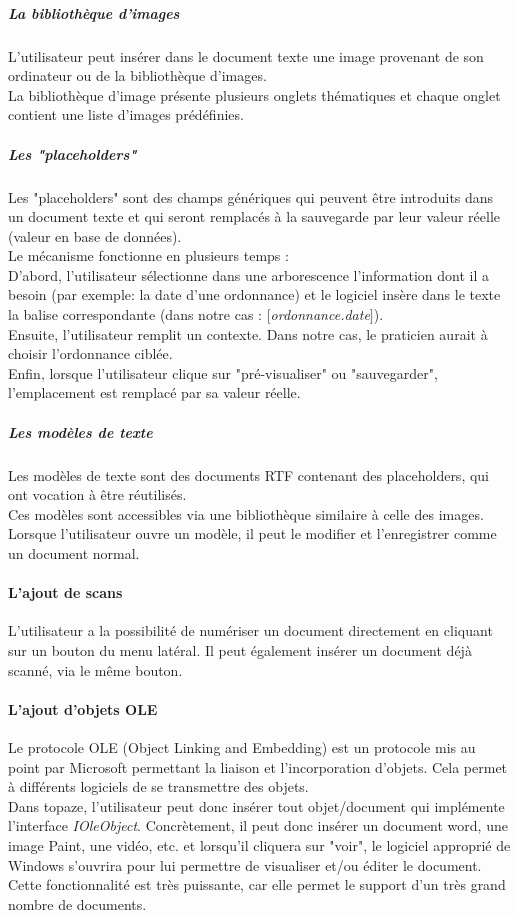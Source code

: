\subparagraph*{La bibliothèque d'images}
L'utilisateur peut insérer dans le document texte une image provenant de son ordinateur ou de la bibliothèque d'images.\\
La bibliothèque d'image présente plusieurs onglets thématiques et chaque onglet contient une liste d'images prédéfinies.

\subparagraph*{Les "placeholders"}
Les "placeholders" sont des champs génériques qui peuvent être introduits dans un document texte et qui seront remplacés à la sauvegarde par leur valeur réelle (valeur en base de données).\\

Le mécanisme fonctionne en plusieurs temps : \\
D'abord, l'utilisateur sélectionne dans une arborescence l'information dont il a besoin (par exemple: la date d'une ordonnance) et le logiciel insère dans le texte la balise correspondante (dans notre cas : \textit{$[$ordonnance.date$]$}). \\
Ensuite, l'utilisateur remplit un contexte. Dans notre cas, le praticien aurait à choisir l'ordonnance ciblée.\\
Enfin, lorsque l'utilisateur clique sur "pré-visualiser" ou "sauvegarder", l'emplacement est remplacé par sa valeur réelle.

\subparagraph*{Les modèles de texte}
Les modèles de texte sont des documents \gls{RTF} contenant des placeholders, qui ont vocation à être réutilisés.\\
Ces modèles sont accessibles via une bibliothèque similaire à celle des images. 
Lorsque l'utilisateur ouvre un modèle, il peut le modifier et l'enregistrer comme un document normal. 

\paragraph*{L'ajout de scans \\}
L'utilisateur a la possibilité de numériser un document directement en cliquant sur un bouton du menu latéral. Il peut également insérer un document déjà scanné, via le même bouton.

\paragraph*{L'ajout d'objets OLE\\}
Le protocole OLE (Object Linking and Embedding) est un protocole mis au point par Microsoft permettant la liaison et l'incorporation d'objets. Cela permet à différents logiciels de se transmettre des objets. \\
Dans topaze, l'utilisateur peut donc insérer tout objet/document qui implémente l'interface \textit{IOleObject}. Concrètement, il peut donc insérer un document word, une image Paint, une vidéo, etc. et lorsqu'il cliquera sur "voir", le logiciel approprié de Windows s'ouvrira pour lui permettre de visualiser et/ou éditer le document.
Cette fonctionnalité est très puissante, car elle permet le support d'un très grand nombre de documents. 

